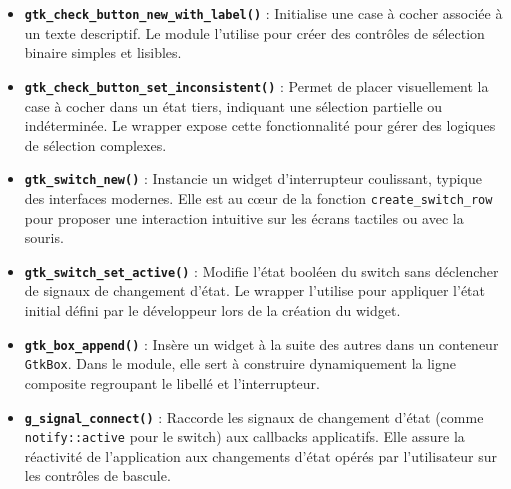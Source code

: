 \begin{itemize}
    \item \textbf{\texttt{gtk\_check\_button\_new\_with\_label()}} : Initialise une case à cocher associée à un texte descriptif. Le module l'utilise pour créer des contrôles de sélection binaire simples et lisibles.
    \item \textbf{\texttt{gtk\_check\_button\_set\_inconsistent()}} : Permet de placer visuellement la case à cocher dans un état tiers, indiquant une sélection partielle ou indéterminée. Le wrapper expose cette fonctionnalité pour gérer des logiques de sélection complexes.
    \item \textbf{\texttt{gtk\_switch\_new()}} : Instancie un widget d'interrupteur coulissant, typique des interfaces modernes. Elle est au cœur de la fonction \texttt{create\_switch\_row} pour proposer une interaction intuitive sur les écrans tactiles ou avec la souris.
    \item \textbf{\texttt{gtk\_switch\_set\_active()}} : Modifie l'état booléen du switch sans déclencher de signaux de changement d'état. Le wrapper l'utilise pour appliquer l'état initial défini par le développeur lors de la création du widget.
    \item \textbf{\texttt{gtk\_box\_append()}} : Insère un widget à la suite des autres dans un conteneur \texttt{GtkBox}. Dans le module, elle sert à construire dynamiquement la ligne composite regroupant le libellé et l'interrupteur.
    \item \textbf{\texttt{g\_signal\_connect()}} : Raccorde les signaux de changement d'état (comme \texttt{notify::active} pour le switch) aux callbacks applicatifs. Elle assure la réactivité de l'application aux changements d'état opérés par l'utilisateur sur les contrôles de bascule.
\end{itemize}

\newpage
